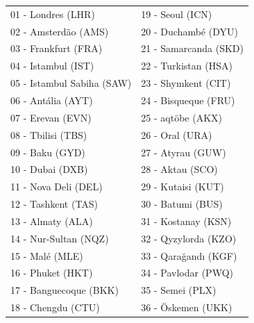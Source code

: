 \begin{center}
\begin{tabular}{ l l }
        01 - Londres (LHR) & 19 - Seoul (ICN)\\
        02 - Amsterdão (AMS) & 20 - Duchambé (DYU)\\
        03 - Frankfurt (FRA) & 21 - Samarcanda (SKD)\\
        04 - Istambul (IST) &  22 - Turkistan (HSA)\\
        05 - Istambul Sabiha (SAW) & 23 - Shymkent (CIT)\\
        06 - Antália (AYT) & 24 - Bisqueque (FRU)\\
        07 - Erevan (EVN) & 25 - aqtöbe (AKX)\\
        08 - Tbilisi (TBS) & 26 - Oral (URA)\\
        09 - Baku (GYD) & 27 - Atyrau (GUW)\\
        10 - Dubai (DXB) & 28 - Aktau (SCO)\\
        11 - Nova Deli (DEL) & 29 - Kutaisi (KUT)\\
        12 - Tashkent (TAS) &  30 - Batumi (BUS)\\
        13 - Almaty (ALA) & 31 - Kostanay (KSN)\\
        14 - Nur-Sultan (NQZ) &  32 - Qyzylorda (KZO)\\
        15 - Malé (MLE) & 33 - Qarağandı (KGF)\\
        16 - Phuket (HKT) & 34 - Pavlodar (PWQ)\\
        17 - Banguecoque (BKK) & 35 - Semei (PLX)\\
        18 - Chengdu (CTU) & 36 - Öskemen (UKK)\\
\end{tabular}
\end{center}
